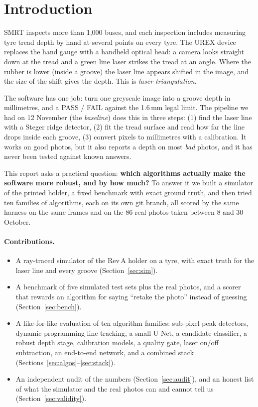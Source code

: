 \section{Introduction}

SMRT inspects more than 1{,}000 buses, and each inspection includes measuring tyre tread depth by hand at several
points on every tyre. The UREX device replaces the hand gauge with a handheld optical head: a camera looks straight
down at the tread and a green line laser strikes the tread at an angle. Where the rubber is lower (inside a groove)
the laser line appears shifted in the image, and the size of the shift gives the depth. This is \emph{laser
triangulation}.

The software has one job: turn one greyscale image into a groove depth in millimetres, and a PASS / FAIL against the
1.6\,mm legal limit. The pipeline we had on 12 November (the \emph{baseline}) does this in three steps:
(1) find the laser line with a Steger ridge detector, (2) fit the tread surface and read how far the line drops
inside each groove, (3) convert pixels to millimetres with a calibration. It works on good photos, but it also
reports a depth on most \emph{bad} photos, and it has never been tested against known answers.

This report asks a practical question: \textbf{which algorithms actually make the software more robust, and by how
much?} To answer it we built a simulator of the printed holder, a fixed benchmark with exact ground truth, and then
tried ten families of algorithms, each on its own git branch, all scored by the same harness on the same frames and
on the 86 real photos taken between 8 and 30 October.

\paragraph{Contributions.}
\begin{itemize}
\item A ray-traced simulator of the Rev\,A holder on a tyre, with exact truth for the laser line and every groove
      (Section~\ref{sec:sim}).
\item A benchmark of five simulated test sets plus the real photos, and a scorer that rewards an algorithm for
      saying ``retake the photo'' instead of guessing (Section~\ref{sec:bench}).
\item A like-for-like evaluation of ten algorithm families: sub-pixel peak detectors, dynamic-programming line
      tracking, a small U-Net, a candidate classifier, a robust depth stage, calibration models, a quality gate,
      laser on/off subtraction, an end-to-end network, and a combined stack (Sections~\ref{sec:algos}--\ref{sec:stack}).
\item An independent audit of the numbers (Section~\ref{sec:audit}), and an honest list of what the simulator and the
      real photos can and cannot tell us (Section~\ref{sec:validity}).
\end{itemize}

